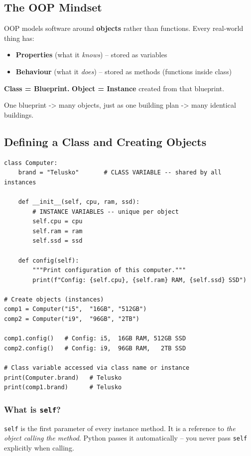 \documentclass[12pt,a4paper]{article}
\newcommand{\code}[1]{\texttt{\small\color{pyblue}#1}}
\begin{document}
\subsection{The OOP Mindset}

OOP models software around \textbf{objects} rather than functions. Every real-world thing has:
\begin{itemize}
  \item \textbf{Properties} (what it \textit{knows}) -- stored as variables
  \item \textbf{Behaviour} (what it \textit{does}) -- stored as methods (functions inside class)
\end{itemize}

\textbf{Class = Blueprint.} \textbf{Object = Instance} created from that blueprint.

One blueprint -> many objects, just as one building plan -> many identical buildings.

\subsection{Defining a Class and Creating Objects}

\begin{lstlisting}
class Computer:
    brand = "Telusko"       # CLASS VARIABLE -- shared by all instances

    def __init__(self, cpu, ram, ssd):
        # INSTANCE VARIABLES -- unique per object
        self.cpu = cpu
        self.ram = ram
        self.ssd = ssd

    def config(self):
        """Print configuration of this computer."""
        print(f"Config: {self.cpu}, {self.ram} RAM, {self.ssd} SSD")

# Create objects (instances)
comp1 = Computer("i5",  "16GB", "512GB")
comp2 = Computer("i9",  "96GB", "2TB")

comp1.config()   # Config: i5,  16GB RAM, 512GB SSD
comp2.config()   # Config: i9,  96GB RAM,   2TB SSD

# Class variable accessed via class name or instance
print(Computer.brand)   # Telusko
print(comp1.brand)      # Telusko
\end{lstlisting}

\subsubsection{What is \texttt{self}?}

\code{self} is the first parameter of every instance method. It is a reference to \textit{the object calling the method}. Python passes it automatically -- you never pass \code{self} explicitly when calling.
\end{document}
